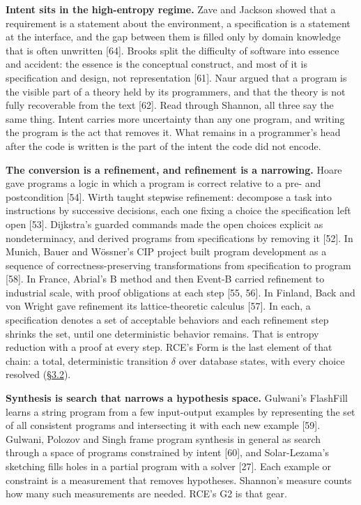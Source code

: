 \documentclass[10pt,letterpaper]{article}
\begin{document}
\textbf{Intent sits in the high-entropy regime.} Zave and Jackson showed
that a requirement is a statement about the environment, a specification
is a statement at the interface, and the gap between them is filled only
by domain knowledge that is often unwritten {[}64{]}. Brooks split the
difficulty of software into essence and accident: the essence is the
conceptual construct, and most of it is specification and design, not
representation {[}61{]}. Naur argued that a program is the visible part
of a theory held by its programmers, and that the theory is not fully
recoverable from the text {[}62{]}. Read through Shannon, all three say
the same thing. Intent carries more uncertainty than any one program,
and writing the program is the act that removes it. What remains in a
programmer's head after the code is written is the part of the intent
the code did not encode.

\textbf{The conversion is a refinement, and refinement is a narrowing.}
Hoare gave programs a logic in which a program is correct relative to a
pre- and postcondition {[}54{]}. Wirth taught stepwise refinement:
decompose a task into instructions by successive decisions, each one
fixing a choice the specification left open {[}53{]}. Dijkstra's guarded
commands made the open choices explicit as nondeterminacy, and derived
programs from specifications by removing it {[}52{]}. In Munich, Bauer
and Wössner's CIP project built program development as a sequence of
correctness-preserving transformations from specification to program
{[}58{]}. In France, Abrial's B method and then Event-B carried
refinement to industrial scale, with proof obligations at each step
{[}55, 56{]}. In Finland, Back and von Wright gave refinement its
lattice-theoretic calculus {[}57{]}. In each, a specification denotes a
set of acceptable behaviors and each refinement step shrinks the set,
until one deterministic behavior remains. That is entropy reduction with
a proof at every step. RCE's Form is the last element of that chain: a
total, deterministic transition \(\delta\) over database states, with
every choice resolved
(\href{https://research.openie.dev/papers/rce/\#32-definitions}{§3.2}).

\textbf{Synthesis is search that narrows a hypothesis space.} Gulwani's
FlashFill learns a string program from a few input-output examples by
representing the set of all consistent programs and intersecting it with
each new example {[}59{]}. Gulwani, Polozov and Singh frame program
synthesis in general as search through a space of programs constrained
by intent {[}60{]}, and Solar-Lezama's sketching fills holes in a
partial program with a solver {[}27{]}. Each example or constraint is a
measurement that removes hypotheses. Shannon's measure counts how many
such measurements are needed. RCE's G2 is that gear.
\end{document}
